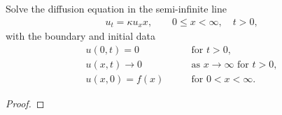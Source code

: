 \begin{problem}{2.22}
  Solve the diffusion equation in the semi-infinite line
  \begin{align*}
    u_t = \kappa u_xx, \qquad 0 \leq x < \infty, \quad t > 0,
  \end{align*}
  with the boundary and initial data
  \begin{align*}
    u(0, t) = 0 &\qquad \text{for $t > 0$}, \\
    u(x, t) \to 0 &\qquad \text{as $x \to \infty$ for $t > 0$}, \\
    u(x, 0) = f(x) &\qquad \text{for $0 < x < \infty$}.
  \end{align*}
\end{problem}

\begin{proof}
\end{proof}
\newpage

